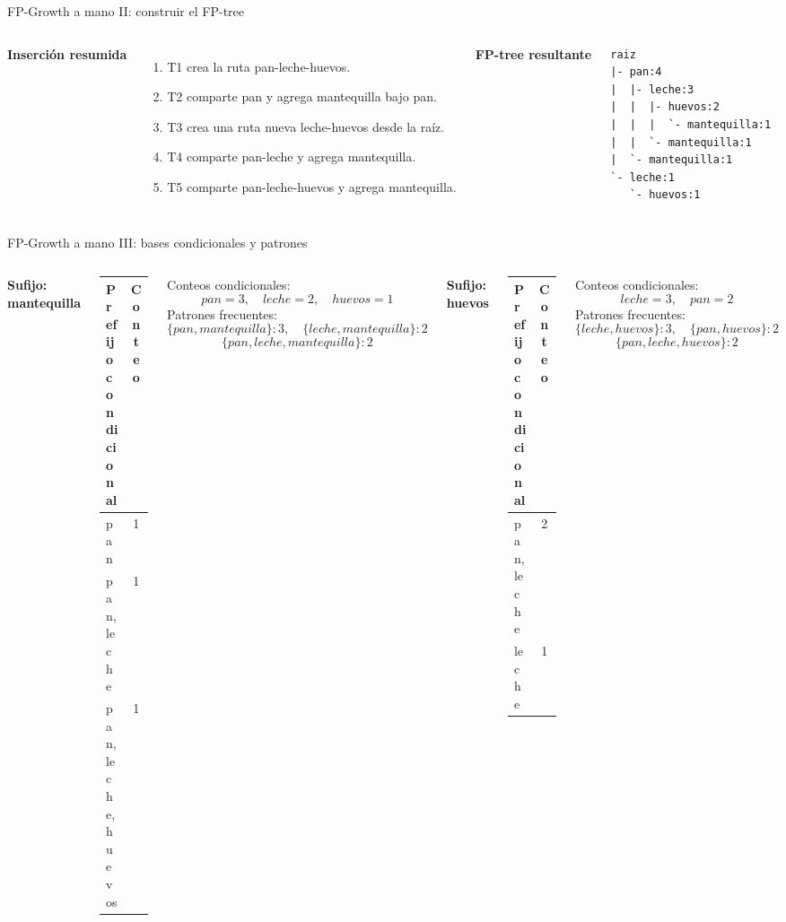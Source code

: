 \documentclass[10pt,aspectratio=169]{beamer}
\begin{document}
\begin{frame}[fragile]{FP-Growth a mano II: construir el FP-tree}
\scriptsize
\begin{columns}[T]
\textbf{Inserción resumida}
\begin{enumerate}
  \item T1 crea la ruta pan-leche-huevos.
  \item T2 comparte pan y agrega mantequilla bajo pan.
  \item T3 crea una ruta nueva leche-huevos desde la raíz.
  \item T4 comparte pan-leche y agrega mantequilla.
  \item T5 comparte pan-leche-huevos y agrega mantequilla.
\end{enumerate}

\textbf{FP-tree resultante}
\begin{verbatim}
raiz
|- pan:4
|  |- leche:3
|  |  |- huevos:2
|  |  |  `- mantequilla:1
|  |  `- mantequilla:1
|  `- mantequilla:1
`- leche:1
   `- huevos:1
\end{verbatim}
\end{columns}
\end{frame}

\begin{frame}{FP-Growth a mano III: bases condicionales y patrones}
\scriptsize
\begin{columns}[T]
\textbf{Sufijo: mantequilla}
\begin{table}
\centering
\begin{tabular}{lc}
\toprule
Prefijo condicional & Conteo \\
\midrule
pan & 1 \\
pan, leche & 1 \\
pan, leche, huevos & 1 \\
\bottomrule
\end{tabular}
\end{table}
Conteos condicionales:
\[
pan=3,\quad leche=2,\quad huevos=1
\]
Patrones frecuentes:
\[
\{pan,mantequilla\}:3,\quad \{leche,mantequilla\}:2
\]
\[
\{pan,leche,mantequilla\}:2
\]

\textbf{Sufijo: huevos}
\begin{table}
\centering
\begin{tabular}{lc}
\toprule
Prefijo condicional & Conteo \\
\midrule
pan, leche & 2 \\
leche & 1 \\
\bottomrule
\end{tabular}
\end{table}
Conteos condicionales:
\[
leche=3,\quad pan=2
\]
Patrones frecuentes:
\[
\{leche,huevos\}:3,\quad \{pan,huevos\}:2
\]
\[
\{pan,leche,huevos\}:2
\]
\end{columns}
\end{frame}
\end{document}
